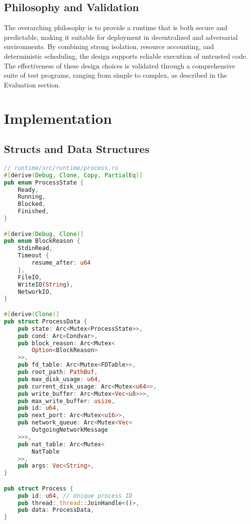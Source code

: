 \documentclass[10pt,a4paper,twocolumn]{IEEEtran}
\begin{document}
\subsection*{Philosophy and Validation}
The overarching philosophy is to provide a runtime that is both secure and predictable, making it suitable for deployment in decentralized and adversarial environments. By combining strong isolation, resource accounting, and deterministic scheduling, the design supports reliable execution of untrusted code. The effectiveness of these design choices is validated through a comprehensive suite of test programs, ranging from simple to complex, as described in the Evaluation section.

\section{Implementation}\label{sec:implementation}

\subsection*{Structs and Data Structures}
\begin{lstlisting}[language=Rust, caption={Key Structs: Process, ProcessData, ProcessState}, label={lst:structs}, basicstyle=\ttfamily\scriptsize, frame=single]
// runtime/src/runtime/process.rs
#[derive(Debug, Clone, Copy, PartialEq)]
pub enum ProcessState {
    Ready,
    Running,
    Blocked,
    Finished,
}

#[derive(Debug, Clone)]
pub enum BlockReason {
    StdinRead,
    Timeout {
        resume_after: u64
    },
    FileIO,
    WriteIO(String),
    NetworkIO,
}

#[derive(Clone)]
pub struct ProcessData {
    pub state: Arc<Mutex<ProcessState>>,
    pub cond: Arc<Condvar>,
    pub block_reason: Arc<Mutex<
        Option<BlockReason>
    >>,
    pub fd_table: Arc<Mutex<FDTable>>,
    pub root_path: PathBuf,
    pub max_disk_usage: u64,
    pub current_disk_usage: Arc<Mutex<u64>>,
    pub write_buffer: Arc<Mutex<Vec<u8>>>,
    pub max_write_buffer: usize,
    pub id: u64,
    pub next_port: Arc<Mutex<u16>>,
    pub network_queue: Arc<Mutex<Vec<
        OutgoingNetworkMessage
    >>>,
    pub nat_table: Arc<Mutex<
        NatTable
    >>,
    pub args: Vec<String>,
}

pub struct Process {
    pub id: u64, // Unique process ID
    pub thread: thread::JoinHandle<()>,
    pub data: ProcessData,
}
\end{lstlisting}
\end{document}
